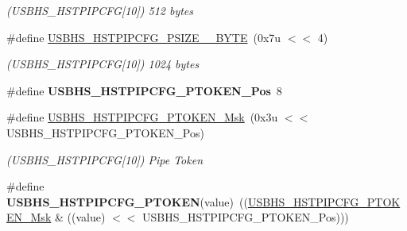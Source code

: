 \begin{DoxyCompactItemize}
\begin{DoxyCompactList}\small\item\em (U\+S\+B\+H\+S\+\_\+\+H\+S\+T\+P\+I\+P\+C\+FG\mbox{[}10\mbox{]}) 512 bytes \end{DoxyCompactList}\item 
\mbox{\label{group__SAMS70__USBHS_ga185427a2b04f2207df1e03b7da4728e4}} 
\#define \mbox{\hyperlink{group__SAMS70__USBHS_ga185427a2b04f2207df1e03b7da4728e4}{U\+S\+B\+H\+S\+\_\+\+H\+S\+T\+P\+I\+P\+C\+F\+G\+\_\+\+P\+S\+I\+Z\+E\+\_\+\_\+\+B\+Y\+TE}}~(0x7u $<$$<$ 4)
\begin{DoxyCompactList}\small\item\em (U\+S\+B\+H\+S\+\_\+\+H\+S\+T\+P\+I\+P\+C\+FG\mbox{[}10\mbox{]}) 1024 bytes \end{DoxyCompactList}\item 
\mbox{\label{group__SAMS70__USBHS_ga2d562fd233ad1cc2f8b5232c21c81b60}} 
\#define {\bfseries U\+S\+B\+H\+S\+\_\+\+H\+S\+T\+P\+I\+P\+C\+F\+G\+\_\+\+P\+T\+O\+K\+E\+N\+\_\+\+Pos}~8
\item 
\mbox{\label{group__SAMS70__USBHS_ga9160ad51dac584e665f3ff920817ff34}} 
\#define \mbox{\hyperlink{group__SAMS70__USBHS_ga9160ad51dac584e665f3ff920817ff34}{U\+S\+B\+H\+S\+\_\+\+H\+S\+T\+P\+I\+P\+C\+F\+G\+\_\+\+P\+T\+O\+K\+E\+N\+\_\+\+Msk}}~(0x3u $<$$<$ U\+S\+B\+H\+S\+\_\+\+H\+S\+T\+P\+I\+P\+C\+F\+G\+\_\+\+P\+T\+O\+K\+E\+N\+\_\+\+Pos)
\begin{DoxyCompactList}\small\item\em (U\+S\+B\+H\+S\+\_\+\+H\+S\+T\+P\+I\+P\+C\+FG\mbox{[}10\mbox{]}) Pipe Token \end{DoxyCompactList}\item 
\mbox{\label{group__SAMS70__USBHS_ga7d1b0be21cfe8f04388bcd96aa50b952}} 
\#define {\bfseries U\+S\+B\+H\+S\+\_\+\+H\+S\+T\+P\+I\+P\+C\+F\+G\+\_\+\+P\+T\+O\+K\+EN}(value)~((\mbox{\hyperlink{group__SAMV71__USBHS_ga9160ad51dac584e665f3ff920817ff34}{U\+S\+B\+H\+S\+\_\+\+H\+S\+T\+P\+I\+P\+C\+F\+G\+\_\+\+P\+T\+O\+K\+E\+N\+\_\+\+Msk}} \& ((value) $<$$<$ U\+S\+B\+H\+S\+\_\+\+H\+S\+T\+P\+I\+P\+C\+F\+G\+\_\+\+P\+T\+O\+K\+E\+N\+\_\+\+Pos)))
\item 
\mbox{\label{group__SAMS70__USBHS_ga13977671c7a6080fe0a24e1fa20b55b2}} 
$$
\end{DoxyCompactItemize}
